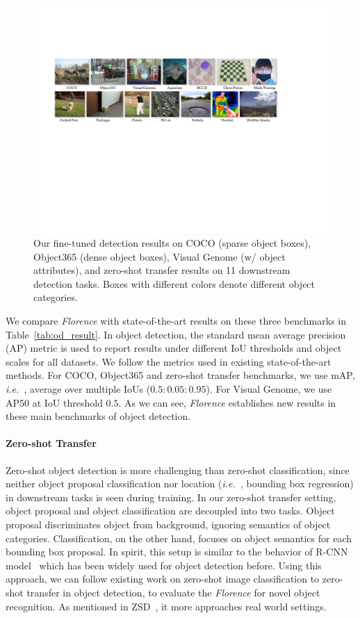 \documentclass{article}
\newcommand{\ie}{{\it{i.e.}~}}
\begin{document}
\begin{figure}[ht]
  \centering
\includegraphics[width=1.0\linewidth]{figure/Detection.pdf} \vspace{-1.5em}
\caption{Our fine-tuned detection results on COCO (sparse object boxes), Object365 (dense object boxes), Visual Genome (w/ object attributes), and zero-shot transfer results on 11 downstream detection tasks. Boxes with different colors denote different object categories.}
\end{figure}\vspace{0.3em}

We compare \emph{Florence} with state-of-the-art results on these three benchmarks in
Table~\ref{tab:od_result}. In object detection, the standard mean average precision (AP) metric is used to report results under different IoU thresholds and object scales for all datasets. We follow the metrics used in existing state-of-the-art methods. For COCO, Object365 and zero-shot transfer benchmarks, we use mAP, \ie, average over multiple IoUs ($0.5:0.05:0.95$). For Visual Genome, we use AP50 at IoU threshold $0.5$. As we can see, \emph{Florence} establishes new results in these main benchmarks of object detection.

\paragraph{Zero-shot Transfer} Zero-shot object detection is more challenging than zero-shot
classification, since neither object proposal classification nor location (\ie, bounding box
regression) in downstream tasks is seen during training. In our zero-shot transfer setting, object proposal and object classification are decoupled into two tasks. Object proposal discriminates object from
background, ignoring semantics of object categories. Classification, on the other hand, focuses on
object semantics for each bounding box proposal.
In spirit, this setup is similar to the behavior of R-CNN model~\cite{RCNN2014} which has been widely used for object detection before. Using this approach, we can follow existing work on zero-shot image classification to zero-shot
transfer in object detection, to evaluate the \emph{Florence} for novel object recognition. As mentioned in ZSD~\cite{bansal2018zero}, it more approaches real world settings.
\end{document}
